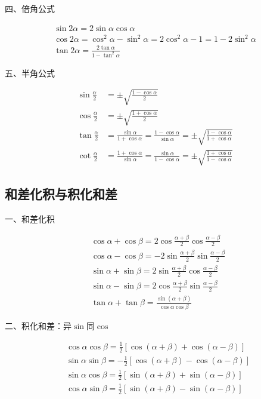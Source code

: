 \noindent 四、倍角公式

\begin{gather*}
  \sin 2\alpha = 2 \sin \alpha \cos \alpha\\
  \cos 2\alpha = \cos^2 \alpha - \sin^2 \alpha = 2 \cos ^2\alpha - 1 = 1 - 2\sin^2 \alpha\\
  \tan 2\alpha = \frac{2 \tan \alpha}{1 - \tan^2 \alpha}
\end{gather*}


\noindent 五、半角公式

\begin{align*}
  \sin \frac{\alpha}{2} &=\pm \sqrt{\frac{1-\cos \alpha}{2}} \\
  \cos \frac{\alpha}{2} &=\pm \sqrt{\frac{1+\cos \alpha}{2}} \\
  \tan \frac{\alpha}{2} &=\frac{\sin \alpha}{1+\cos \alpha}=\frac{1-\cos \alpha}{\sin \alpha}=\pm \sqrt{\frac{1-\cos \alpha}{1+\cos \alpha}} \\
  \cot \frac{\alpha}{2} &=\frac{1+\cos \alpha}{\sin \alpha}=\frac{\sin \alpha}{1-\cos \alpha}=\pm \sqrt{\frac{1+\cos \alpha}{1-\cos \alpha}}
\end{align*}




\subsection{和差化积与积化和差}

\noindent 一、和差化积

\begin{align*}
  &\cos \alpha+\cos \beta=2 \cos \frac{\alpha+\beta}{2} \cos \frac{\alpha-\beta}{2} \\
  &\cos \alpha-\cos \beta=-2 \sin \frac{\alpha+\beta}{2} \sin \frac{\alpha-\beta}{2} \\
  &\sin \alpha+\sin \beta=2 \sin \frac{\alpha+\beta}{2} \cos \frac{\alpha-\beta}{2} \\
  &\sin \alpha-\sin \beta=2 \cos \frac{\alpha+\beta}{2} \sin \frac{\alpha-\beta}{2} \\
  &\tan \alpha+\tan \beta=\frac{\sin (\alpha+\beta)}{\cos \alpha \cos \beta}
\end{align*}

\noindent 二、积化和差：异$\sin$同$\cos$

\begin{align*}
  &\cos \alpha \cos \beta=\frac{1}{2}[\cos (\alpha+\beta)+\cos (\alpha-\beta)] \\
  &\sin \alpha \sin \beta=-\frac{1}{2}[\cos (\alpha+\beta)-\cos (\alpha-\beta)]\\
  &\sin \alpha \cos \beta=\frac{1}{2}[\sin (\alpha+\beta)+\sin (\alpha-\beta)] \\
  &\cos \alpha \sin \beta=\frac{1}{2}[\sin (\alpha+\beta)-\sin (\alpha-\beta)] 
\end{align*}


